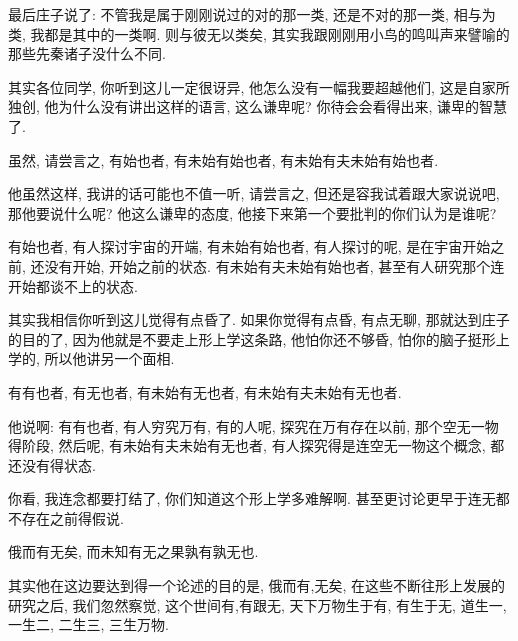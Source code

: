 \documentclass[11pt]{article}
\begin{document}
最后庄子说了: 不管我是属于刚刚说过的对的那一类, 还是不对的那一类, {\color{blue} 相与为类}, 我都是其中的一类啊. {\color{blue} 则与彼无以类矣}, 其实我跟刚刚用小鸟的鸣叫声来譬喻的那些先秦诸子没什么不同. 

其实各位同学, 你听到这儿一定很讶异, 他怎么没有一幅我要超越他们, 这是自家所独创, 他为什么没有讲出这样的语言, 这么谦卑呢? 你待会会看得出来, 谦卑的智慧了.

\begin{center}
	{\color{magenta} 虽然, 请尝言之, 有始也者, 有未始有始也者, 有未始有夫未始有始也者.}
\end{center}

\vspace{-0.5cm}

他虽然这样, 我讲的话可能也不值一听, {\color{blue}请尝言之}, 但还是容我试着跟大家说说吧, 那他要说什么呢? 他这么谦卑的态度, 他接下来第一个要批判的你们认为是谁呢?

{\color{blue} 有始也者}, 有人探讨宇宙的开端, {\color{blue} 有未始有始也者}, 有人探讨的呢, 是在宇宙开始之前, 还没有开始, 开始之前的状态. {\color{blue} 有未始有夫未始有始也者}, 甚至有人研究那个连开始都谈不上的状态.

其实我相信你听到这儿觉得有点昏了. 如果你觉得有点昏, 有点无聊, 那就达到庄子的目的了, 因为他就是不要走上形上学这条路, 他怕你还不够昏, 怕你的脑子挺形上学的, 所以他讲另一个面相.

\begin{center}
	{\color{magenta} 有有也者, 有无也者, 有未始有无也者, 有未始有夫未始有无也者.}
\end{center}

\vspace{-0.5cm}

他说啊: {\color{blue} 有有也者}, 有人穷究万有, 有的人呢, 探究在万有存在以前, 那个空无一物得阶段, 然后呢, {\color{blue} 有未始有夫未始有无也者}, 有人探究得是连空无一物这个概念, 都还没有得状态. 

你看, 我连念都要打结了, 你们知道这个形上学多难解啊. 甚至更讨论更早于连无都不存在之前得假说. 

\begin{center}
	{\color{magenta} 俄而有无矣, 而未知有无之果孰有孰无也.}
\end{center}

\vspace{-0.5cm}

其实他在这边要达到得一个论述的目的是, {\color{blue} 俄而有,无矣}, 在这些不断往形上发展的研究之后, 我们忽然察觉, 这个世间有,有跟无, 天下万物生于有, 有生于无, 道生一, 一生二, 二生三, 三生万物. 
\end{document}
